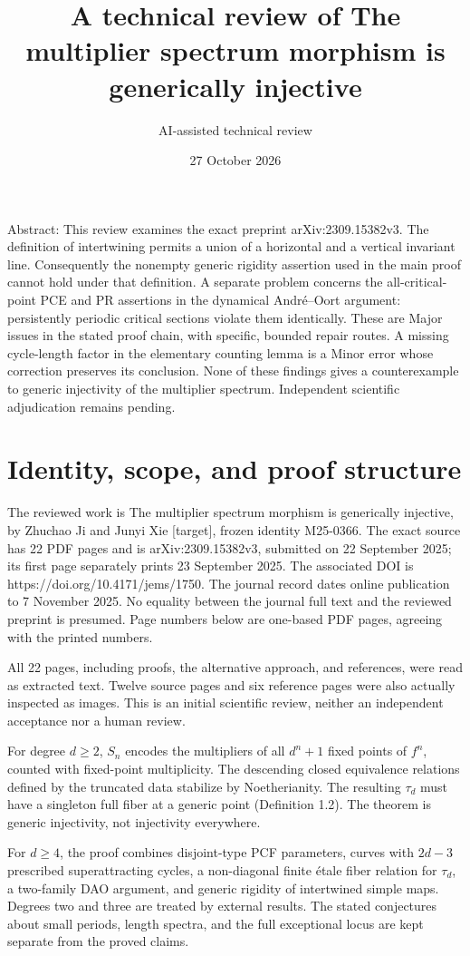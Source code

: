 \documentclass[10pt]{article}
\title{A technical review of
The multiplier spectrum morphism is generically injective}
\author{AI-assisted technical review}
\date{27 October 2026}
\begin{document}
\maketitle
Abstract: This review examines the exact preprint arXiv:2309.15382v3. The definition of intertwining permits a union of a horizontal and a vertical invariant line. Consequently the nonempty generic rigidity assertion used in the main proof cannot hold under that definition. A separate problem concerns the all-critical-point PCE and PR assertions in the dynamical André–Oort argument: persistently periodic critical sections violate them identically. These are Major issues in the stated proof chain, with specific, bounded repair routes. A missing cycle-length factor in the elementary counting lemma is a Minor error whose correction preserves its conclusion. None of these findings gives a counterexample to generic injectivity of the multiplier spectrum. Independent scientific adjudication remains pending.\par
\section*{Identity, scope, and proof structure}
The reviewed work is The multiplier spectrum morphism is generically injective, by Zhuchao Ji and Junyi Xie [target], frozen identity M25-0366. The exact source has 22 PDF pages and is arXiv:2309.15382v3, submitted on 22 September 2025; its first page separately prints 23 September 2025. The associated DOI is https://doi.org/10.4171/jems/1750. The journal record dates online publication to 7 November 2025. No equality between the journal full text and the reviewed preprint is presumed. Page numbers below are one-based PDF pages, agreeing with the printed numbers.\par
All 22 pages, including proofs, the alternative approach, and references, were read as extracted text. Twelve source pages and six reference pages were also actually inspected as images. This is an initial scientific review, neither an independent acceptance nor a human review.\par
For degree \(d\geq2\), \(S_n\) encodes the multipliers of all \(d^n+1\) fixed points of \(f^n\), counted with fixed-point multiplicity. The descending closed equivalence relations defined by the truncated data stabilize by Noetherianity. The resulting \(\tau_d\) must have a singleton full fiber at a generic point (Definition 1.2). The theorem is generic injectivity, not injectivity everywhere.\par
For \(d\geq4\), the proof combines disjoint-type PCF parameters, curves with \(2d-3\) prescribed superattracting cycles, a non-diagonal finite étale fiber relation for \(\tau_d\), a two-family DAO argument, and generic rigidity of intertwined simple maps. Degrees two and three are treated by external results. The stated conjectures about small periods, length spectra, and the full exceptional locus are kept separate from the proved claims.\par
\end{document}
